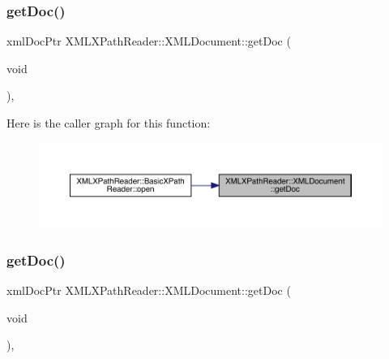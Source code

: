 \mbox{\label{classXMLXPathReader_1_1XMLDocument_aa4fceaafd3c764004b6da33a26acc16d}} 
\subsubsection{\texorpdfstring{getDoc()}{getDoc()}\hspace{0.1cm}{\footnotesize\ttfamily [2/3]}}
{\footnotesize\ttfamily xml\+Doc\+Ptr X\+M\+L\+X\+Path\+Reader\+::\+X\+M\+L\+Document\+::get\+Doc (\begin{DoxyParamCaption}\item[{void}]{ }\end{DoxyParamCaption})\hspace{0.3cm}{\ttfamily [inline]}, {\ttfamily [protected]}}

Here is the caller graph for this function\+:
\nopagebreak
\begin{figure}[H]
\begin{center}
\leavevmode
\includegraphics[width=350pt]{d5/dfd/classXMLXPathReader_1_1XMLDocument_aa4fceaafd3c764004b6da33a26acc16d_icgraph}
\end{center}
\end{figure}
\mbox{\label{classXMLXPathReader_1_1XMLDocument_aa4fceaafd3c764004b6da33a26acc16d}} 
\subsubsection{\texorpdfstring{getDoc()}{getDoc()}\hspace{0.1cm}{\footnotesize\ttfamily [3/3]}}
{\footnotesize\ttfamily xml\+Doc\+Ptr X\+M\+L\+X\+Path\+Reader\+::\+X\+M\+L\+Document\+::get\+Doc (\begin{DoxyParamCaption}\item[{void}]{ }\end{DoxyParamCaption})\hspace{0.3cm}{\ttfamily [inline]}, {\ttfamily [protected]}}

